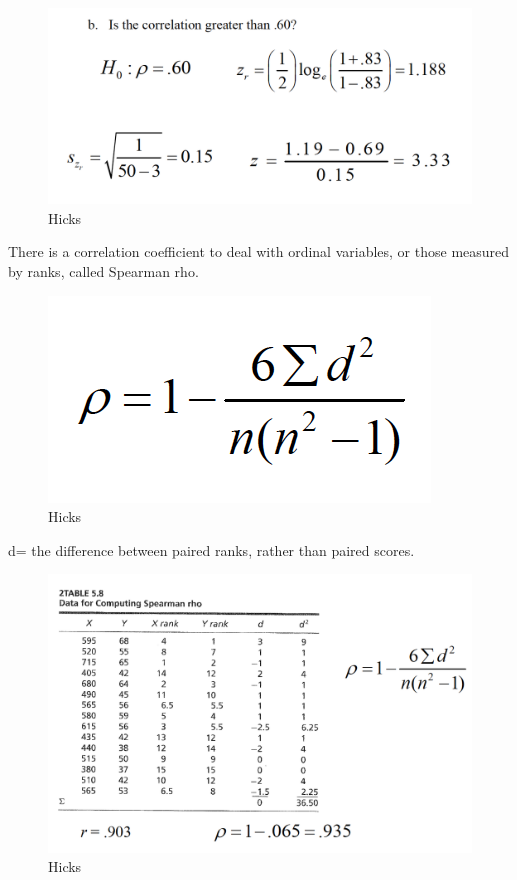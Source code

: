 \documentclass[]{book}
\theoremstyle{definition}
\theoremstyle{definition}
\theoremstyle{definition}
\theoremstyle{remark}
\begin{document}
{\begin{figure}
\centering
\includegraphics{img/hickscor17.png}
\caption{Hicks}
\end{figure}

There is a correlation coefficient to deal with ordinal variables, or
those measured by ranks, called Spearman rho.

\begin{figure}
\centering
\includegraphics{img/hickscor18.png}
\caption{Hicks}
\end{figure}

d= the difference between paired ranks, rather than paired scores.

\begin{figure}
\centering
\includegraphics{img/hickscor19.png}
\caption{Hicks}
\end{figure}

}
\end{document}
